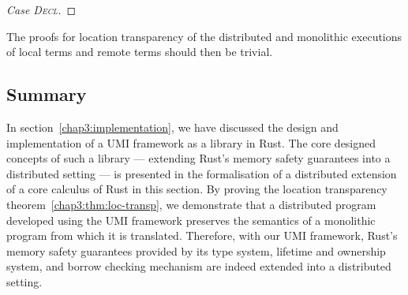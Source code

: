 \begin{proof}[Case \textsc{\emph{Decl}}]
\end{proof}
The proofs for location transparency of the distributed and monolithic executions of local terms and remote terms should then be trivial.

\subsection{Summary}
\label{chap3:semantics:summary}
In section~\ref{chap3:implementation}, we have discussed the design and implementation of a UMI framework as a library in Rust. The core designed concepts of such a library --- extending Rust's memory safety guarantees into a distributed setting --- is presented in the formalisation of a distributed extension of a core calculus of Rust in this section. By proving the location transparency theorem~\ref{chap3:thm:loc-transp}, we demonstrate that a distributed program developed using the UMI framework preserves the semantics of a monolithic program from which it is translated. Therefore, with our UMI framework, Rust's memory safety guarantees provided by its type system, lifetime and ownership system, and borrow checking mechanism are indeed extended into a distributed setting.


